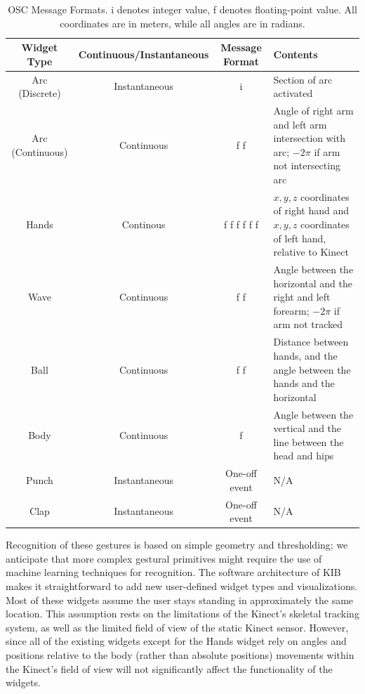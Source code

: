 \documentclass{nime-alternate}
\begin{document}
\begin{table}
\centering
\caption{OSC Message Formats. i denotes integer value, f denotes floating-point value. All coordinates are in meters, while all angles are in radians.}
\begin{tabular}{|c|c|c|p{}|} \hline
\textbf{Widget Type} & \textbf{Continuous/Instantaneous} & \textbf{Message Format} & \textbf{Contents}\\ \hline
Arc (Discrete) & Instantaneous & i & Section of arc activated\\ \hline
Arc (Continuous) & Continuous & f f& Angle of right arm and left arm intersection with arc; $-2\pi$ if arm not intersecting arc\\ \hline
Hands & Continous & f f f f f f & $x,y,z$ coordinates of right hand and $x,y,z$ coordinates of left hand, relative to Kinect \\ \hline
Wave & Continuous & f f & Angle between the horizontal and the right and left forearm; $-2\pi$ if arm not tracked\\ \hline
Ball & Continuous & f f & Distance between hands, and the angle between the hands
and the horizontal\\ \hline
Body & Continuous & f & Angle between the vertical and the line between the head and hips\\ \hline
Punch & Instantaneous & One-off event & N/A \\ \hline
Clap & Instantaneous & One-off event & N/A \\ \hline
\end{tabular}
\label{tab:osc}
\end{table}

Recognition of these gestures is based on simple geometry and thresholding; we anticipate that more complex
gestural primitives might require the use of machine learning techniques for recognition.
The software architecture of KIB makes it straightforward to add new user-defined widget types and visualizations. 
Most of these widgets assume the user stays standing in approximately the same
location. This assumption rests on the limitations of the Kinect's skeletal tracking system,
as well as the limited field of view of the static Kinect sensor. However, since all of the
existing widgets except for the Hands widget rely on angles and positions relative to the body (rather than
absolute positions) movements within the Kinect's field of view will not significantly affect the
functionality of the widgets.
\end{document}
